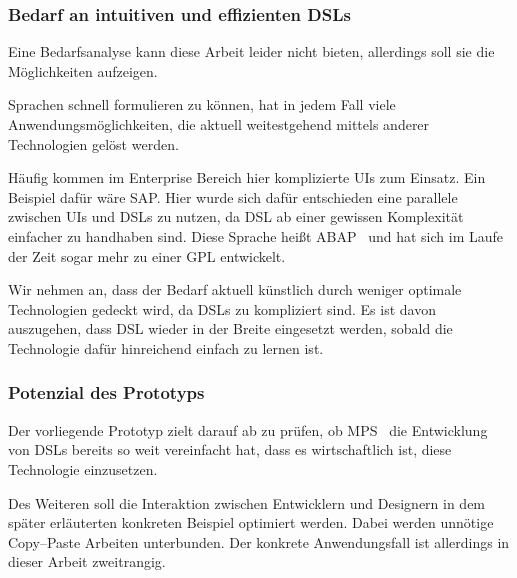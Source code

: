 \subsubsection{Bedarf an intuitiven und effizienten \aclp{DSL}}
Eine Bedarfsanalyse kann diese Arbeit leider nicht bieten, allerdings soll sie die Möglichkeiten aufzeigen.

Sprachen schnell formulieren zu können, hat in jedem Fall viele Anwendungsmöglichkeiten, die aktuell weitestgehend mittels anderer Technologien gelöst werden.

Häufig kommen im Enterprise Bereich hier komplizierte \acp{UI} zum Einsatz.
Ein Beispiel dafür wäre SAP\@.
Hier wurde sich dafür entschieden eine parallele zwischen \acp{UI} und \acp{DSL} zu nutzen, da \ac{DSL} ab einer gewissen Komplexität einfacher zu handhaben sind.
Diese Sprache heißt ABAP~\autocite{sap-se-no-date} und hat sich im Laufe der Zeit sogar mehr zu einer \ac{GPL} entwickelt.

Wir nehmen an, dass der Bedarf aktuell künstlich durch weniger optimale Technologien gedeckt wird, da \acp{DSL} zu kompliziert sind.
Es ist davon auszugehen, dass \ac{DSL} wieder in der Breite eingesetzt werden, sobald die Technologie dafür hinreichend einfach zu lernen ist.

\subsubsection{Potenzial des Prototyps}
Der vorliegende Prototyp zielt darauf ab zu prüfen, ob \ac{MPS}~\autocite{jetbrains-sro-2021} die Entwicklung von \acp{DSL} bereits so weit vereinfacht hat, dass es wirtschaftlich ist, diese Technologie einzusetzen.

Des Weiteren soll die Interaktion zwischen Entwicklern und Designern in dem später erläuterten konkreten Beispiel optimiert werden.
Dabei werden unnötige Copy--Paste Arbeiten unterbunden.
Der konkrete Anwendungsfall ist allerdings in dieser Arbeit zweitrangig.


